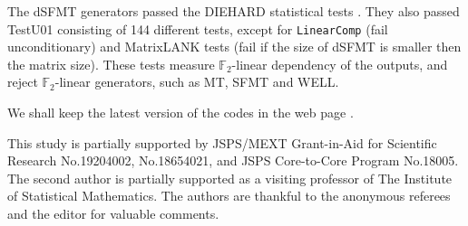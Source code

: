 \documentclass{svmult}
\begin{document}

The dSFMT generators passed the DIEHARD statistical tests \cite{diehard}.
They also passed TestU01 \cite{TESTU01} consisting of
144 different tests, except for 
\texttt{LinearComp} (fail unconditionary) and 
MatrixLANK tests (fail if the size of dSFMT is smaller then 
the matrix size). These tests measure ${\mathbb F}_2$-linear 
dependency of the outputs, and reject ${\mathbb F}_2$-linear generators, 
such as MT, SFMT and WELL.

We shall keep the latest version of the codes in the web page \cite{web:SFMT}.


\begin{acknowledgement}
This study is partially
supported by JSPS/MEXT Grant-in-Aid for Scientific Research
No.19204002, No.18654021, and JSPS Core-to-Core Program
No.18005. The second author is partially supported
as a visiting professor of The Institute of Statistical 
Mathematics. The authors are thankful to the anonymous 
referees and the editor for valuable comments.
\end{acknowledgement}



\end{document}
